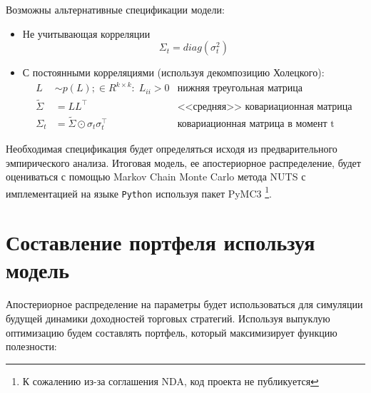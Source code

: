 Возможны альтернативные спецификации модели:
\begin{itemize}
	\item Не учитывающая корреляции
	\begin{equation}
	\Sigma_t = diag(\sigma^2_t)\label{eq:nocorr}
	\end{equation}
	
	\item С постоянными корреляциями (используя декомпозицию Холецкого):
	\begin{align}
	L &\sim p(L);\in R^{k\times k}:\; L_{ii} > 0 & \text{нижняя треугольная матрица}\nonumber\\
	\tilde{\Sigma} &= LL^\top & \text{<<средняя>> ковариационная матрица}\nonumber\\
	\Sigma_t &= \tilde{\Sigma} \odot \sigma_t\sigma_t^\top & \text{ковариационная матрица в момент t}\label{eq:staticcorr}
	\end{align}
\end{itemize}

Необходимая спецификация будет определяться исходя из предварительного эмпирического анализа. Итоговая модель, ее апостериорное распределение, будет оцениваться с помощью Markov Chain Monte Carlo метода NUTS \citep{hoffman2011nuts} с имплементацией на языке \texttt{Python} используя пакет PyMC3 \citep{salvatier2016pymc3}\footnote{К сожалению из-за соглашения NDA, код проекта не публикуется}.

\section{Составление портфеля используя модель}
Апостериорное распределение на параметры будет использоваться для симуляции будущей динамики доходностей торговых стратегий. Используя выпуклую оптимизацию будем составлять портфель, который максимизирует функцию полезности:

